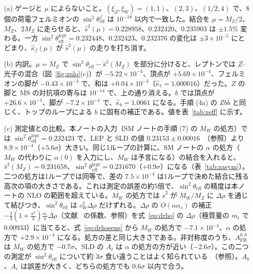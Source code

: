 \documentclass[a4paper,10pt]{ltjsarticle}
\newcommand{\MSbar}{\overline{\mathrm{MS}}}
\begin{document}
(a) ゲージと $\mu$ によらないこと。$(\xi_Z,\xi_W)=(1,1)$、$(2,3)$、$(1/2,4)$ で、8個の荷電フェルミオンの $\sin^2\theta^f_{\mathrm{eff}}$ は $10^{-18}$ 以内で一致した。結合を $\mu=M_Z/2$、$M_Z$、$2M_Z$ に走らせると、$\hat s^2(\mu)=0.228958$、$0.232420$、$0.235903$ は $\pm1.5\%$ 変わる。一方 $\sin^2\theta^{\mathrm{lept}}_{\mathrm{eff}}=0.232448$、$0.232423$、$0.232376$ の変化は $\pm3\times10^{-5}$ にとどまり、$\hat\kappa_f(\mu)$ が $\hat s^2(\mu)$ の走りを打ち消す。

(b) 内訳。$\mu=M_Z$ で $\sin^2\theta_{\mathrm{eff}}-\hat s^2(M_Z)$ を部分に分けると、レプトンでは $Z$--光子の混合（図~\ref{fig:znlo}(c)）が $-5.22\times10^{-4}$、頂点が $+5.69\times10^{-4}$、フェルミオンの脚が $-0.43\times10^{-4}$ で、和は $+0.04\times10^{-4}$（$\hat\kappa_\ell=1.000016$）だった。$Z$ の脚と $\MSbar$ の対抗項の寄与は $10^{-14}$ で、上の通り消える。$b$ では頂点が $+26.6\times10^{-4}$、脚が $-7.2\times10^{-4}$ で、$\hat\kappa_b=1.0061$ になる。手順 (4a) の $Zb\bar b$ と同じく、トップのループによる $b$ に固有の補正である。値を表~\ref{tab:zeff} に示す。

(c) 測定値との比較。本ノートの入力（SM ノートの手順 (7) の $M_W$ の処方）では $\sin^2\theta^{\mathrm{lept}}_{\mathrm{eff}}=0.232423$ で、LEP と SLD の値 $0.23153\pm0.00016$~\cite{lepewwg06}（参照）より $8.9\times10^{-4}$（$+5.6\sigma$）大きい。同じ1ループの計算に、SM ノートの $\alpha$ の処方（$M_W$ の代わりに $\alpha(0)$ を入力にし、$M_W$ は予言になる）の結合を入れると、$\hat s^2(M_Z)=0.231658$、$\sin^2\theta^{\mathrm{lept}}_{\mathrm{eff}}=0.231670$（$+0.9\sigma$）になる（表~\ref{tab:zasym}）。二つの処方は1ループでは同等で、差の $7.5\times10^{-4}$ は1ループで決めた結合に残る高次の項の大きさである。これは測定の誤差の約5倍で、$\sin^2\theta_{\mathrm{eff}}$ の精度は本ノートの NLO の範囲を超えている。$M_W$ の処方では $\hat s^2$ が $M_W/M_Z$ に $\Delta\rho$ を通じて結びつき、$\sin^2\theta_{\mathrm{eff}}$ は $c_W^2\Delta\rho$ だけずれる。$\Delta\rho$ の $O(\alpha\alpha_s)$ の補正 $-\frac23(1+\frac{\pi^2}3)\frac{\alpha_s}\pi\Delta\rho$（文献~\cite{dv87} の係数、参照）を式~\eqref{eq:drho} の $\Delta\rho$（極質量の $m_t$ で $0.00933$）に当てると、式~\eqref{eq:drhosens} から $M_W$ の処方で $-7.1\times10^{-4}$、$\alpha$ の処方で $+2.9\times10^{-4}$ になる。処方の差と同じ大きさである。非対称度のうち、$A^{0,b}_{\mathrm{FB}}$ は $M_W$ の処方で $-0.7\sigma$、SLD の $A_\ell$ は $\alpha$ の処方の方が近い（$-2.6\sigma$）。この二つの測定が $\sin^2\theta_{\mathrm{eff}}$ について約 $3\sigma$ 食い違うことはよく知られている~\cite{lepewwg06}（参照）。$A_b$、$A_c$ は誤差が大きく、どちらの処方でも $0.6\sigma$ 以内で合う。
\end{document}
